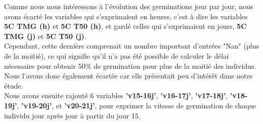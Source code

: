 \documentclass[12pt]{report}
\begin{document}
Comme nous nous intéressons à l'évolution des germinations jour par jour, nous avons écarté les variables qui s'exprimaient en heures, c'est à dire les variables \textbf{5\textdegree C TMG (h)} et \textbf{5\textdegree C T50 (h)}, et gardé celles qui s'exprimaient en jours, \textbf{5\textdegree C TMG (j)} et \textbf{5\textdegree C T50 (j)}.\\
Cependant, cette dernière comprenait un nombre important d'entrées "Nan" (plus de la moitié), ce qui signifie qu'il n'a pas été possible de calculer le délai nécessaire pour obtenir 50\% de germination pour plus de la moitié des individus. Nous l'avons donc également écartée car elle présentait peu d'intérêt dans notre étude.\\

Nous avons ensuite rajouté 6 variables \textbf{'v15-16j'}, \textbf{'v16-17j'}, \textbf{'v17-18j'}, \textbf{'v18-19j'}, \textbf{'v19-20j'}, et \textbf{'v20-21j'},  pour exprimer la vitesse de germination de chaque individu jour après jour à partir du jour 15.
\end{document}
